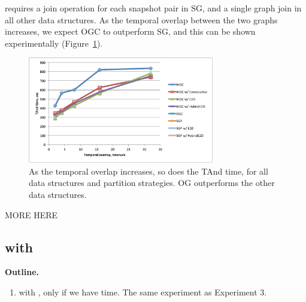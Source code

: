  requires a join operation for each snapshot pair in SG,
and a single graph join in all other data structures.  As the temporal
overlap between the two graphs increases, we expect OGC to outperform
SG, and this can be shown experimentally (Figure~\ref{fig:tandall}).

\begin{figure}[t!]
\includegraphics[width=3.2in]{figs/tand_all_warm.pdf}
\caption{As the temporal overlap increases, so does the TAnd time, for
  all data structures and partition strategies.  OG outperforms the
  other data structures.}
\label{fig:tandall}
\end{figure}

MORE HERE

\subsection{ with }

{\bf Outline.}

\begin{enumerate}

\item {} with , only if we have time. The
  same experiment as Experiment 3.

\end{enumerate}
